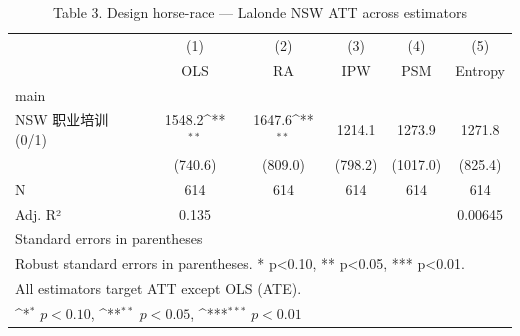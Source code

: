 \begin{table}[htbp]\centering
\def\sym#1{\ifmmode^{#1}\else\(^{#1}\)\fi}
\caption{Table 3. Design horse-race — Lalonde NSW ATT across estimators}
\begin{tabular}{l*{5}{c}}
\toprule
                    &\multicolumn{1}{c}{(1)}&\multicolumn{1}{c}{(2)}&\multicolumn{1}{c}{(3)}&\multicolumn{1}{c}{(4)}&\multicolumn{1}{c}{(5)}\\
                    &\multicolumn{1}{c}{OLS}&\multicolumn{1}{c}{RA}&\multicolumn{1}{c}{IPW}&\multicolumn{1}{c}{PSM}&\multicolumn{1}{c}{Entropy}\\
\midrule
main                &                     &                     &                     &                     &                     \\
NSW 职业培训 (0/1)  &      1548.2\sym{**} &      1647.6\sym{**} &      1214.1         &      1273.9         &      1271.8         \\
                    &     (740.6)         &     (809.0)         &     (798.2)         &    (1017.0)         &     (825.4)         \\
\midrule
N                   &         614         &         614         &         614         &         614         &         614         \\
Adj. R²             &       0.135         &                     &                     &                     &     0.00645         \\
\bottomrule
\multicolumn{6}{l}{\footnotesize Standard errors in parentheses}\\
\multicolumn{6}{l}{\footnotesize Robust standard errors in parentheses. * p<0.10, ** p<0.05, *** p<0.01.}\\
\multicolumn{6}{l}{\footnotesize All estimators target ATT except OLS (ATE).}\\
\multicolumn{6}{l}{\footnotesize \sym{*} \(p<0.10\), \sym{**} \(p<0.05\), \sym{***} \(p<0.01\)}\\
\end{tabular}
\end{table}
